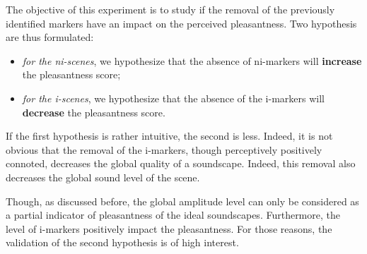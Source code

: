 \documentclass[12pt]{elsarticle}
\begin{document}

The objective of this experiment is to study if the removal of the previously identified markers have an impact on the perceived pleasantness. Two hypothesis are thus formulated:


\begin{itemize}
\item \emph{for the ni-scenes}, we hypothesize that the absence of ni-markers will \textbf{increase} the pleasantness score;
\item \emph{for the i-scenes}, we hypothesize that the absence of the i-markers will \textbf{decrease} the pleasantness score.
\end{itemize}


If the first hypothesis is rather intuitive, the second is less. Indeed, it is not obvious that the removal of the i-markers, though perceptively positively connoted, decreases the global quality of a soundscape. Indeed, this removal also decreases the global sound level of the scene.


Though, as discussed before, the global amplitude level can only be considered as a partial indicator of pleasantness of the ideal soundscapes. Furthermore, the level of i-markers positively impact the pleasantness. For those reasons, the validation of the second hypothesis is of high interest.
\end{document}
